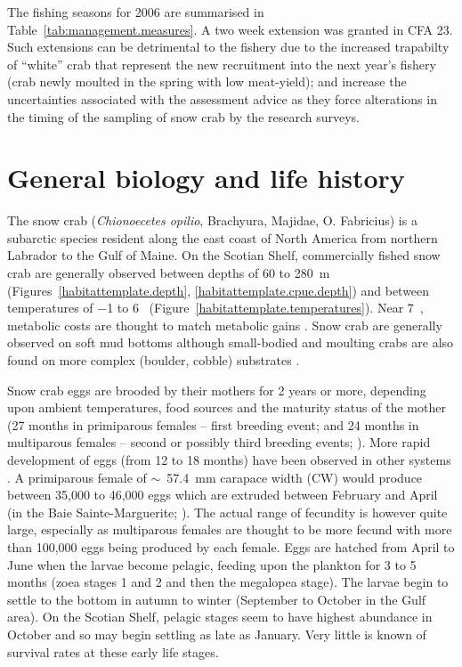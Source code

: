 \documentclass[11pt]{article}
\newcommand{\minus}{$-$}
\begin{document}
The fishing seasons for 2006 are summarised in Table~\ref{tab:management.measures}. A two week extension was granted in CFA 23. Such extensions can be detrimental to the fishery due to the increased trapabilty of ``white'' crab that represent the new recruitment into the next year's fishery (crab newly moulted in the spring with low meat-yield); and increase the uncertainties associated with the assessment advice as they force alterations in the timing of the sampling of snow crab by the research surveys. 

\section{General biology and life history}

The snow crab (\textit{Chionoecetes opilio}, Brachyura, Majidae, O. Fabricius) is a subarctic species resident along the east coast of North America from northern Labrador to the Gulf of Maine. On the Scotian Shelf, commercially fished snow crab are generally observed between depths of 60 to 280~m (Figures~\ref{habitattemplate.depth}, \ref{habitattemplate.cpue.depth}) and between temperatures of \minus 1 to 6~\celsius {} (Figure~\ref{habitattemplate.temperatures}). Near 7~\celsius, metabolic costs are thought to match metabolic gains \citep{Foyle1989}. Snow crab are generally observed on soft mud bottoms although small-bodied and moulting crabs are also found on more complex (boulder, cobble) substrates \citep{Sainte-MarieHazel1992, Comeau1998}.

Snow crab eggs are brooded by their mothers for 2 years or more, depending upon ambient temperatures, food sources and the maturity status of the mother (27 months in primiparous females -- first breeding event; and 24 months in multiparous females -- second or possibly third breeding events; \citealt{Sainte-Marie1993}). More rapid development of eggs (from 12 to 18 months) have been observed in other systems \citep{Elner1995}. A primiparous female of $\sim$~57.4~mm carapace width (CW) would produce between 35,000 to 46,000 eggs which are extruded between February and April (in the Baie Sainte-Marguerite; \citealt{Sainte-Marie1993}). The actual range of fecundity is however quite large, especially as multiparous females are thought to be more fecund with more than 100,000 eggs being produced by each female. Eggs are hatched from April to June when the larvae become pelagic, feeding upon the plankton for 3 to 5 months (zoea stages 1 and 2 and then the megalopea stage). The larvae begin to settle to the bottom in autumn to winter (September to October in the Gulf area). On the Scotian Shelf, pelagic stages seem to have highest abundance in October and so may begin settling as late as January. Very little is known of survival rates at these early life stages.
\end{document}
